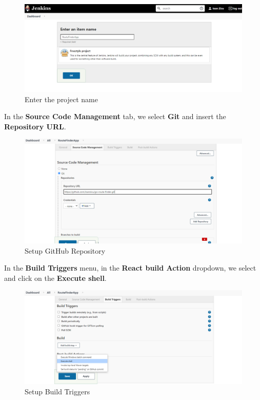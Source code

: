 \documentclass[12pt,a4paper,twoside]{article}
\begin{document}
\begin{figure}[H]
    \centering
        \includegraphics[width=15cm]{images-aws/33-jenkins-set-project-name.png}
        \caption{Enter the project name}
\end{figure}


In the \textbf{Source Code Management} tab, we select \textbf{Git} and insert the \textbf{Repository URL}.


\begin{figure}[H]
    \centering
        \includegraphics[width=15cm]{images-aws/34-jenkins-setup-repo-no-error.png}
        \caption{Setup GitHub Repository}
\end{figure}


In the \textbf{Build Triggers} menu, in the \textbf{React build Action} dropdown, we select and click on the \textbf{Execute shell}.


\begin{figure}[H]
    \centering
        \includegraphics[width=15cm]{images-aws/35-jenkins-build-setup.png}
        \caption{Setup Build Triggers}
\end{figure}
\end{document}
